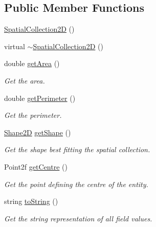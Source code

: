 \subsection*{Public Member Functions}
\begin{DoxyCompactItemize}
\item 
\hyperlink{classmultiscale_1_1analysis_1_1SpatialCollection2D_a3fa52a3930e498d763930a0c6a23a03c}{Spatial\-Collection2\-D} ()
\item 
virtual \hyperlink{classmultiscale_1_1analysis_1_1SpatialCollection2D_af70ae8f44636e7b2cf85705cffe44dfe}{$\sim$\-Spatial\-Collection2\-D} ()
\item 
double \hyperlink{classmultiscale_1_1analysis_1_1SpatialCollection2D_a192a2f1ee9e3af90a40c8c7c47618965}{get\-Area} ()
\begin{DoxyCompactList}\small\item\em Get the area. \end{DoxyCompactList}\item 
double \hyperlink{classmultiscale_1_1analysis_1_1SpatialCollection2D_a736028971bede12a98dbb72d5b0f1354}{get\-Perimeter} ()
\begin{DoxyCompactList}\small\item\em Get the perimeter. \end{DoxyCompactList}\item 
\hyperlink{namespacemultiscale_1_1analysis_ad1ef6155ab2e954c1c33d3e2e6b53fbf}{Shape2\-D} \hyperlink{classmultiscale_1_1analysis_1_1SpatialCollection2D_a7144355774b561b660adfca759316037}{get\-Shape} ()
\begin{DoxyCompactList}\small\item\em Get the shape best fitting the spatial collection. \end{DoxyCompactList}\item 
Point2f \hyperlink{classmultiscale_1_1analysis_1_1SpatialCollection2D_ac8b879dca765e47b9e0ef86d440e28e6}{get\-Centre} ()
\begin{DoxyCompactList}\small\item\em Get the point defining the centre of the entity. \end{DoxyCompactList}\item 
string \hyperlink{classmultiscale_1_1analysis_1_1SpatialCollection2D_a6ff771bb6022d9c991348f29227d10d9}{to\-String} ()
\begin{DoxyCompactList}\small\item\em Get the string representation of all field values. \end{DoxyCompactList}\end{DoxyCompactItemize}
